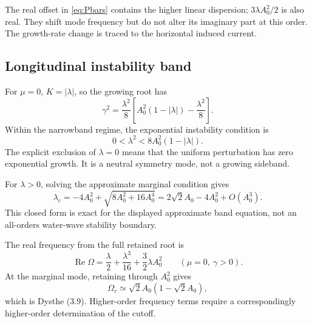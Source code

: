 The real offset in \eqref{eq:Pbars} contains the higher linear dispersion;
$3\lambda A_0^2/2$ is also real. They shift mode frequency but do not
alter its imaginary part at this order. The growth-rate change is traced
to the horizontal induced current.

\subsection{Longitudinal instability band}
For $\mu=0$, $K=|\lambda|$, so the growing root has
\begin{equation}\label{eq:dysthe-growth}
 \gamma^2=\frac{\lambda^2}{8}
 \left[A_0^2(1-|\lambda|)-\frac{\lambda^2}{8}\right].
\end{equation}
Within the narrowband regime, the exponential instability condition is
\begin{equation}\label{eq:dysthe-band}
 0<\lambda^2<8A_0^2(1-|\lambda|).
\end{equation}
The explicit exclusion of $\lambda=0$ means that the uniform perturbation
has zero exponential growth. It is a neutral symmetry mode, not a growing
sideband.

For $\lambda>0$, solving the approximate marginal condition gives
\[
 \lambda_c=-4A_0^2+\sqrt{8A_0^2+16A_0^4}
           =2\sqrt2A_0-4A_0^2+O(A_0^3).
\]
This closed form is exact for the displayed approximate band equation,
not an all-orders water-wave stability boundary.

The real frequency from the full retained root is
\[
 \operatorname{Re}\Omega=\frac\lambda2+\frac{\lambda^3}{16}
                         +\frac32\lambda A_0^2
 \qquad(\mu=0,\ \gamma>0).
\]
At the marginal mode, retaining through $A_0^2$ gives
\begin{equation}\label{eq:marginal-frequency}
 \Omega_c\simeq\sqrt2A_0(1-\sqrt2A_0),
\end{equation}
which is Dysthe (3.9). Higher-order frequency terms require a
correspondingly higher-order determination of the cutoff.

